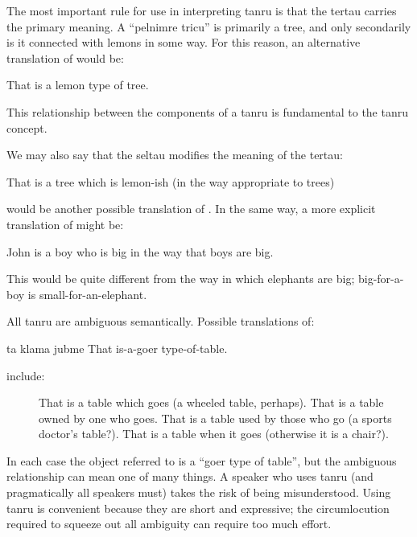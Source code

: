 The most important rule for use in interpreting tanru is
    that the tertau carries the primary meaning. A ``pelnimre
    tricu'' is primarily a tree, and only secondarily is it
    connected with lemons in some way. For this reason, an
    alternative translation of 
    would be:
\begin{example}
That is a lemon type of tree.
\end{example}

This  relationship between the components of a
    tanru is fundamental to the tanru concept.

We may also say that the seltau modifies the meaning of the
    tertau:
\begin{example}
That is a tree which is lemon-ish\n
\T	(in the way appropriate to trees)
\end{example}

{\noindent}would be another possible translation of . In the same way, a more explicit
    translation of  might be:
\begin{example}
John is a boy who is big in the way that boys are big.
\end{example}

This  would be quite different from
    the way in which elephants are big; big-for-a-boy is
    small-for-an-elephant.

All tanru are ambiguous semantically. Possible translations
    of:
\begin{example}
ta klama jubme\n
That is-a-goer type-of-table.
\end{example}

{\noindent}include: 
\begin{description}
\item[] That is a table which goes (a wheeled table, perhaps). That is a table owned by one who goes. That is a table used by those who go (a sports doctor's table?). That is a table when it goes (otherwise it is a chair?).
\end{description}

In each case the object referred to is a ``goer type of
    table'', but the ambiguous  relationship can mean
    one of many things. A speaker who uses tanru (and pragmatically
    all speakers must) takes the risk of being misunderstood. Using
    tanru is convenient because they are short and expressive; the
    circumlocution required to squeeze out all ambiguity can
    require too much effort. 

